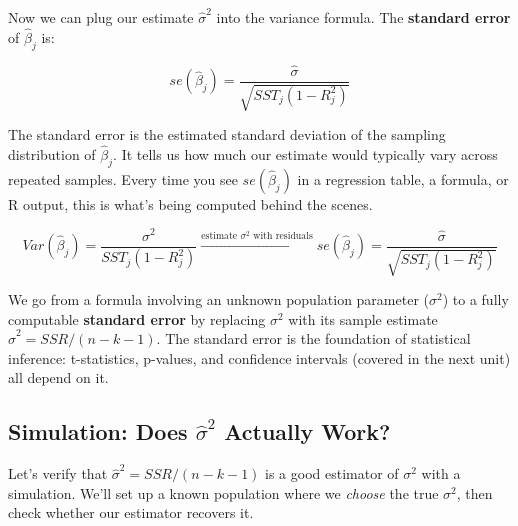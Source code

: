 \documentclass[
  letterpaper,
  DIV=11,
  numbers=noendperiod]{scrreprt}
\begin{document}
Now we can plug our estimate \(\hat{\sigma}^2\) into the variance
formula. The \textbf{standard error} of \(\hat{\beta}_j\) is:

\[
se(\hat{\beta}_j) = \frac{\hat{\sigma}}{\sqrt{SST_j(1 - R_j^2)}}
\]

The standard error is the estimated standard deviation of the sampling
distribution of \(\hat{\beta}_j\). It tells us how much our estimate
would typically vary across repeated samples. Every time you see
\(se(\hat{\beta}_j)\) in a regression table, a formula, or R output,
this is what's being computed behind the scenes.

\begin{tcolorbox}[enhanced jigsaw, arc=.35mm, bottomrule=.15mm, bottomtitle=1mm, breakable, colback=white, colbacktitle=quarto-callout-tip-color!10!white, colframe=quarto-callout-tip-color-frame, coltitle=black, left=2mm, leftrule=.75mm, opacityback=0, opacitybacktitle=0.6, rightrule=.15mm, title=\textcolor{quarto-callout-tip-color}{\faLightbulb}\hspace{0.5em}{The Big Picture}, titlerule=0mm, toprule=.15mm, toptitle=1mm]

\[Var(\hat{\beta}_j) = \frac{\sigma^2}{SST_j(1-R_j^2)} \xrightarrow{\text{estimate } \sigma^2 \text{ with residuals}} se(\hat{\beta}_j) = \frac{\hat{\sigma}}{\sqrt{SST_j(1-R_j^2)}}\]

We go from a formula involving an unknown population parameter
(\(\sigma^2\)) to a fully computable \textbf{standard error} by
replacing \(\sigma^2\) with its sample estimate
\(\hat{\sigma}^2 = SSR/(n-k-1)\). The standard error is the foundation
of statistical inference: t-statistics, p-values, and confidence
intervals (covered in the next unit) all depend on it.

\end{tcolorbox}

\subsection{\texorpdfstring{Simulation: Does \(\hat{\sigma}^2\) Actually
Work?}{Simulation: Does \textbackslash hat\{\textbackslash sigma\}\^{}2 Actually Work?}}\label{simulation-does-hatsigma2-actually-work}

Let's verify that \(\hat{\sigma}^2 = SSR/(n-k-1)\) is a good estimator
of \(\sigma^2\) with a simulation. We'll set up a known population where
we \emph{choose} the true \(\sigma^2\), then check whether our estimator
recovers it.
\end{document}
